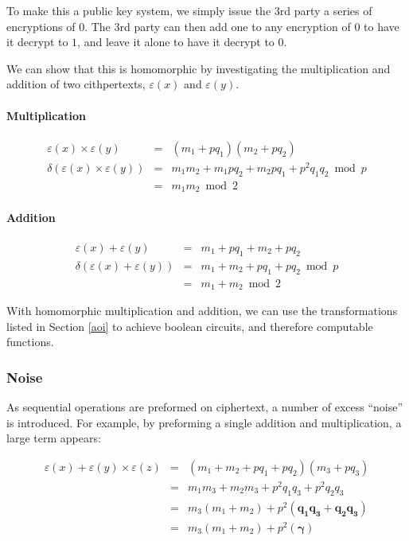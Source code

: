 \documentclass[a4paper,10pt]{article}
\begin{document}
To make this a public key system, we simply issue the 3rd party a
series of encryptions of $0$. The 3rd party can then add one to any
encryption of $0$ to have it decrypt to $1$, and leave it alone to
have it decrypt to $0$.

We can show that this is homomorphic by investigating the
multiplication and addition of two cithpertexts, $ \varepsilon(x) $
and $ \varepsilon(y) $.

\paragraph{Multiplication}
\begin{eqnarray*}
\varepsilon(x) \times \varepsilon(y) &=& (m_1 + p q_1)(m_2 + p q_2)\\
\delta(\varepsilon(x) \times \varepsilon(y))&=& m_1m_2 + m_1pq_2 + m_2pq_1 + p^2q_1q_2 \bmod p\\
&=& m_1m_2 \bmod 2
\end{eqnarray*}

\paragraph{Addition}
\begin{eqnarray*}
\varepsilon(x) + \varepsilon(y) &=& m_1 + p q_1 + m_2 + p q_2\\
\delta(\varepsilon(x) + \varepsilon(y))&=& m_1 + m_2 + pq_1 + pq_2 \bmod p\\
&=& m_1 + m_2 \bmod 2
\end{eqnarray*}

With homomorphic multiplication and addition, we can use the
transformations listed in Section \ref{aoi} to achieve boolean
circuits, and therefore computable functions.

\subsubsection{Noise}
As sequential operations are preformed on ciphertext, a number of
excess ``noise'' is introduced. For example, by preforming a single
addition and multiplication, a large term appears:

\begin{eqnarray*}
\varepsilon(x) + \varepsilon(y) \times \varepsilon(z) &=& (m_1 + m_2 + pq_1 + pq_2)(m_3 + pq_3)\\
&=&m_1m_3 + m_2m_3 + p^2q_1q_3 + p^2q_2q_3\\
&=&m_3(m_1 + m_2) + p^2(\mathbf{q_1q_3 + q_2q_3})\\
&=&m_3(m_1 + m_2) + p^2(\mathbf{\gamma})
\end{eqnarray*}
\end{document}
